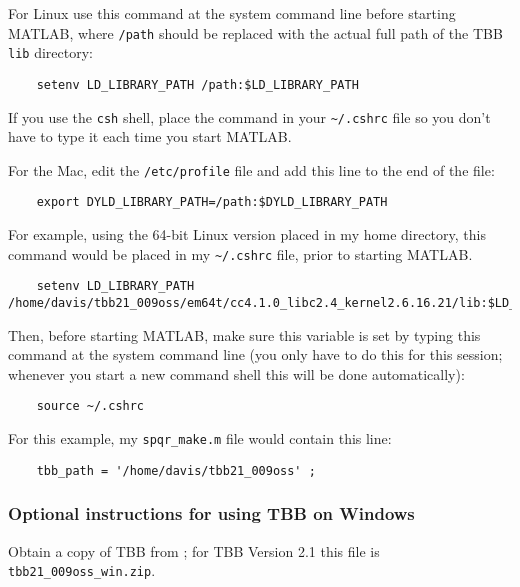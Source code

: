\documentclass[12pt]{article}
\begin{document}
For Linux use this command at the system command line before starting MATLAB,
where \verb'/path' should be replaced with the actual full path of the TBB
\verb'lib' directory:

\begin{verbatim}
    setenv LD_LIBRARY_PATH /path:$LD_LIBRARY_PATH
\end{verbatim}

If you use the \verb'csh' shell, place the command in your \verb'~/.cshrc'
file so you don't have to type it each time you start MATLAB.

For the Mac, edit the \verb'/etc/profile' file and add this line to the end of
the file:

\begin{verbatim}
    export DYLD_LIBRARY_PATH=/path:$DYLD_LIBRARY_PATH
\end{verbatim}

For example, using the 64-bit Linux version placed in my home directory, this
command would be placed in my \verb'~/.cshrc' file, prior to starting MATLAB.

{\scriptsize
\begin{verbatim}
    setenv LD_LIBRARY_PATH /home/davis/tbb21_009oss/em64t/cc4.1.0_libc2.4_kernel2.6.16.21/lib:$LD_LIBRARY_PATH
\end{verbatim}
}

Then, before starting MATLAB, make sure this variable is set by typing this
command at the system command line (you only have to do this for this session;
whenever you start a new command shell this will be done automatically): 

\begin{verbatim}
    source ~/.cshrc
\end{verbatim}

For this example, my \verb'spqr_make.m' file would contain this line:

\begin{verbatim}
    tbb_path = '/home/davis/tbb21_009oss' ;
\end{verbatim}

\subsubsection{Optional instructions for using TBB on Windows}

Obtain a copy of TBB from
; for TBB Version 2.1 this file is \verb'tbb21_009oss_win.zip'.
\end{document}
